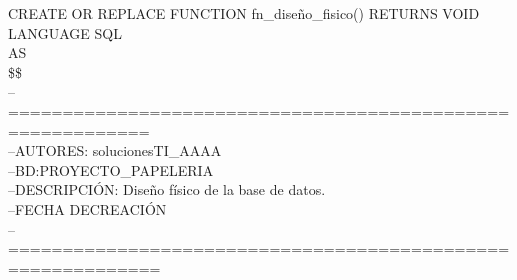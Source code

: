 \documentclass[10pt]{report}
\begin{document}
    \begin{flushleft} \ttfamily 

   CREATE OR REPLACE FUNCTION fn\_diseño\_fisico() RETURNS VOID
    LANGUAGE SQL\\
    AS\\
    \$\$\\
	--===========================================================\\
	--AUTORES: solucionesTI\_AAAA\\
	--BD:PROYECTO\_PAPELERIA\\
	--DESCRIPCIÓN: Diseño físico de la base de datos.\\
	--FECHA DECREACIÓN \\
	--============================================================\\


\end{flushleft}
\end{document}
